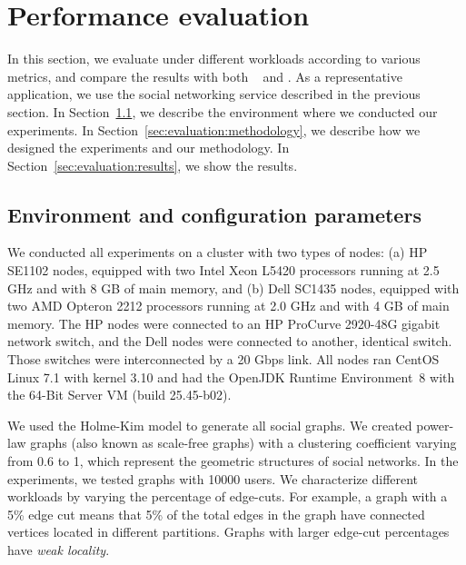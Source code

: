 \section{Performance evaluation}
\label{sec:experiments}

In this section, we evaluate \dynastar{} under different workloads
according to various metrics, and compare the results with both
\ssmr{}~\cite{bezerra2014ssmr} and \dssmr. As a representative
application, we use the \appname{} social networking service described in the
previous section. In Section~\ref{sec:evaluation:setup}, we
describe the environment where we conducted our experiments.  In
Section~\ref{sec:evaluation:methodology}, we describe how we designed
the experiments and our methodology.  In
Section~\ref{sec:evaluation:results}, we show the results.

\subsection{Environment and configuration parameters}
\label{sec:evaluation:setup}

We conducted all experiments on a cluster with two types of nodes: (a)
HP SE1102 nodes, equipped with two Intel Xeon L5420 processors running
at 2.5 GHz and with 8 GB of main memory, and (b) Dell SC1435 nodes,
equipped with two AMD Opteron 2212 processors running at 2.0 GHz and
with 4 GB of main memory. The HP nodes were connected to an HP
ProCurve 2920-48G gigabit network switch, and the Dell nodes were
connected to another, identical switch. Those switches were
interconnected by a 20 Gbps link.  All nodes ran CentOS Linux 7.1 with
kernel 3.10 and had the OpenJDK Runtime Environment~8 with the
\mbox{64-Bit} Server VM (build 25.45-b02).

We used the Holme-Kim model \cite{holme-kim} to generate all social
graphs.  We created power-law graphs (also known as scale-free graphs)
with a clustering coefficient varying from 0.6 to 1, which represent the geometric
structures of social networks. 
In the experiments, we tested graphs with 10000 users. We characterize 
different workloads by varying the percentage of edge-cuts.
For example, a graph with a 5\% edge cut means that 5\% of the total edges
in the graph have connected vertices located in different partitions.
Graphs with larger edge-cut percentages have \emph{weak locality}.

